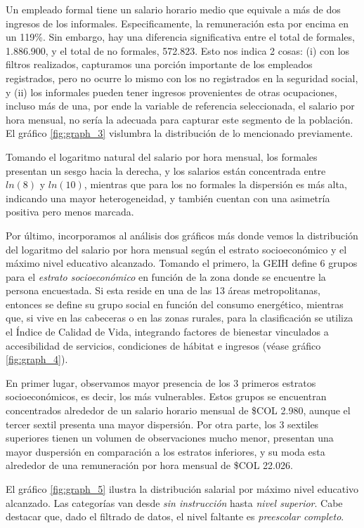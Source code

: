\documentclass[11pt,oneside]{article}
\begin{document}
	Un empleado formal tiene un salario horario medio que equivale a más de dos ingresos de los informales. Especificamente, la remuneración esta por encima en un 119\%. Sin embargo, hay una diferencia significativa entre el total de formales, 1.886.900, y el total de no formales, 572.823. Esto nos indica 2 cosas: (i) con los filtros realizados, capturamos una porción importante de los empleados registrados, pero no ocurre lo mismo con los no registrados en la seguridad social, y (ii) los informales pueden tener ingresos provenientes de otras ocupaciones, incluso más de una, por ende la variable de referencia seleccionada, el salario por hora mensual, no sería la adecuada para capturar este segmento de la población. El gráfico \ref{fig:graph_3} vislumbra la distribución de lo mencionado previamente. 
	
	Tomando el logaritmo natural del salario por hora mensual, los formales presentan un sesgo hacia la derecha, y los salarios están concentrada entre $ln(8)$ y $ln(10)$, mientras que para los no formales la dispersión es más alta, indicando una mayor heterogeneidad, y también cuentan con una asimetría positiva pero menos marcada.
	
	Por último, incorporamos al análisis dos gráficos más donde vemos la distribución del logaritmo del salario por hora mensual según el estrato socioeconómico y el máximo nivel educativo alcanzado. Tomando el primero, la GEIH define 6 grupos para el \textit{estrato socioeconómico} en función de la zona donde se encuentre la persona encuestada. Si esta reside en una de las 13 áreas metropolitanas, entonces se define su grupo social en función del consumo energético, mientras que, si vive en las cabeceras o en las zonas rurales, para la clasificación se utiliza el Índice de Calidad de Vida, integrando factores de bienestar vinculados a accesibilidad de servicios, condiciones de hábitat e ingresos (véase gráfico \ref{fig:graph_4}).
	
	En primer lugar, observamos mayor presencia de los 3 primeros estratos socioeconómicos, es decir, los más vulnerables. Estos grupos se encuentran concentrados alrededor de un salario horario mensual de \$COL 2.980, aunque el tercer sextil presenta una mayor dispersión. Por otra parte, los 3 sextiles superiores tienen un volumen de observaciones mucho menor, presentan una mayor duspersión en comparación a los estratos inferiores, y su moda esta alrededor de una remuneración por hora mensual de \$COL 22.026. 
	
	El gráfico \ref{fig:graph_5} ilustra la distribución salarial por máximo nivel educativo alcanzado. Las categorías van desde \textit{sin instrucción} hasta \textit{nivel superior}. Cabe destacar que, dado el filtrado de datos, el nivel faltante es \textit{preescolar completo}.
	
\end{document}
